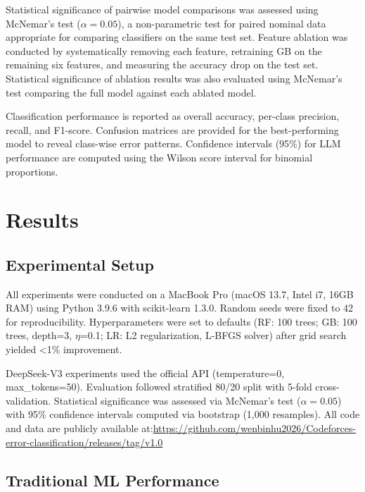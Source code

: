 \documentclass[10pt,a4paper]{article}
\begin{document}
Statistical significance of pairwise model comparisons was assessed using
McNemar's test \cite{mcnemar1947note} ($\alpha = 0.05$), a non-parametric test for paired nominal
data appropriate for comparing classifiers on the same test set.
Feature ablation was conducted by systematically removing each feature,
retraining GB on the remaining six features, and measuring the accuracy
drop on the test set. Statistical significance of ablation results was also
evaluated using McNemar's test comparing the full model against each ablated
model.

Classification performance is reported as overall accuracy, per-class
precision, recall, and F1-score. Confusion matrices are provided for the
best-performing model to reveal class-wise error patterns. Confidence
intervals (95\%) for LLM performance are computed using the Wilson score
interval for binomial proportions.

\section{Results}

\subsection{Experimental Setup}

All experiments were conducted on a MacBook Pro (macOS 13.7, Intel i7, 16GB RAM) using Python 3.9.6 with scikit-learn 1.3.0. Random seeds were fixed to 42 for reproducibility. Hyperparameters were set to defaults (RF: 100 trees; GB: 100 trees, depth=3, $\eta$=0.1; LR: L2 regularization, L-BFGS solver) after grid search yielded <1\% improvement.

DeepSeek-V3 experiments used the official API (temperature=0, max\_tokens=50). Evaluation followed stratified 80/20 split with 5-fold cross-validation. Statistical significance was assessed via McNemar's test ($\alpha=0.05$) with 95\% confidence intervals computed via bootstrap (1,000 resamples). All code and data are publicly available at:\url{https://github.com/wenbinhu2026/Codeforces-error-classification/releases/tag/v1.0}


\subsection{Traditional ML Performance}
\end{document}
